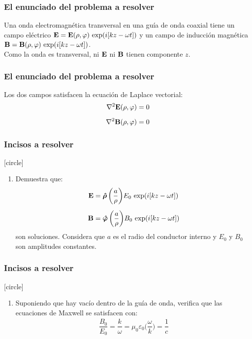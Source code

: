 \documentclass[12pt]{beamer}
\begin{document}
\begin{frame}
\frametitle{El enunciado del problema a resolver}
Una onda electromagnética transversal en una guía de onda coaxial tiene un campo eléctrico $\vb{E} = \vb{E} (\rho, \varphi) \, \exp(i [k z - \omega t])$ \pause y un campo de inducción magnética $\vb{B} = \vb{B} (\rho, \varphi) \, \exp(i [k z - \omega t])$.
\\
\bigskip
\pause
Como la onda es transversal, ni $\vb{E}$ ni $\vb{B}$ tienen componente $z$.
\end{frame}
\begin{frame}
\frametitle{El enunciado del problema a resolver}
Los dos campos satisfacen la ecuación de Laplace vectorial:
\pause
\begin{align*}
\laplacian{\vb{E} (\rho, \varphi)} &= 0 \\[0.5em]
\laplacian{\vb{B} (\rho, \varphi)} &= 0
\end{align*}
\end{frame}
\begin{frame}
\frametitle{Incisos a resolver}
[circle]
\begin{enumerate}[<+->]
\item Demuestra que:
\begin{align*}
\vb{E} &= \vu{\bm{\rho}} \, \bigg( \dfrac{a}{\rho} \bigg) E_{0} \, \exp(i [k z - \omega t]) \\[0.5em]
\vb{B} &= \vu{\bm{\varphi}} \, \bigg( \dfrac{a}{\rho} \bigg) B_{0} \, \exp(i [k z - \omega t])
\end{align*}
son soluciones. Considera que $a$ es el radio del conductor interno y $E_{0}$ y $B_{0}$ son amplitudes constantes.
\seti
\end{enumerate}
\end{frame}
\begin{frame}
\frametitle{Incisos a resolver}
[circle]
\begin{enumerate}[<+->]
\conti
\item Suponiendo que hay vacío dentro de la guía de onda, verifica que las ecuaciones de Maxwell se satisfacen con:
\begin{align*}
\dfrac{B_{0}}{E_{0}} = \dfrac{k}{\omega} = \mu_{0} \varepsilon_{0} \bigg( \dfrac{\omega}{k} \bigg) = \dfrac{1}{c}
\end{align*}
\end{enumerate}
\end{frame}
\end{document}
